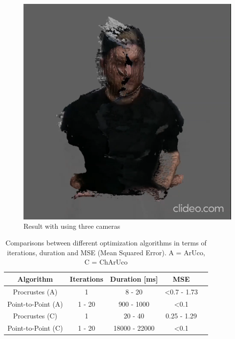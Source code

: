 \documentclass[10pt,twocolumn,letterpaper]{article}
\begin{document}
\begin{figure}[t]
\begin{center}
\includegraphics[width=0.65\linewidth]{imgs/res3}
\end{center}
 \caption{Result with using three cameras}
 \label{fig:res3}
\end{figure}

\begin{table}[h!]
  \begin{center}
    \begin{tabular}{c|c|c|c p{4cm}}
      \textbf{Algorithm} & \textbf{Iterations} & \textbf{Duration [ms]} & \textbf{MSE}\\
      \hline
      Procrustes (A)  & 1 & 8 - 20 & \textless 0.7 - 1.73\\
      Point-to-Point (A) & 1 - 20 & 900 - 1000 & \textless 0.1\\
      Procrustes (C) & 1 & 20 - 40 & 0.25 - 1.29\\
      Point-to-Point (C) & 1 - 20 & 18000 - 22000 & \textless 0.1\\
    \end{tabular}
     \caption{Comparisons between different optimization algorithms in terms of iterations, duration and MSE (Mean Squared Error). A = ArUco, C = ChArUco}
     \label{tab:camera-calibration}
  \end{center}
\end{table}
\end{document}
